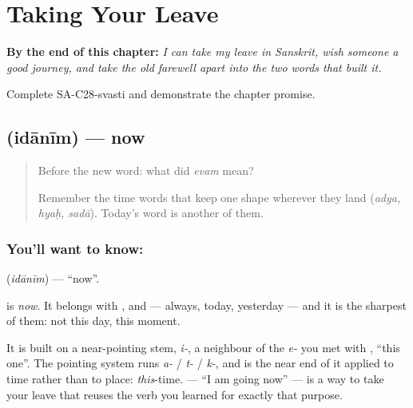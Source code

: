 
\chapter{Taking Your Leave}
\label{ch:sa-leave-more}

\begin{chapteropening}
\textbf{By the end of this chapter:} \emph{I can take my leave in Sanskrit, wish someone a good journey, and take the old farewell apart into the two words that built it.}

Complete SA-C28-svasti and demonstrate the chapter promise.
\end{chapteropening}

\section[\texorpdfstring{\sk{इदानीम्} (idānīm)}{इदानीम् (idānīm)}]{ (idānīm) — now}

\label{lesson:SA-C28-now}



\begin{quote}
Before the new word: what did \emph{evam} mean?

Remember the time words that keep one shape wherever they land (\emph{adya, hyaḥ, sadā}). Today's word is another of them.
\end{quote}

\subsection*{You'll want to know: }
\textbf{} (\emph{idānīm}) — \textquotedblleft{}now\textquotedblright{}.

\textbf{} is \emph{now}. It belongs with ,  and  — always, today, yesterday — and it is the sharpest of them: not this day, this moment.

It is built on a near-pointing stem, \emph{i-}, a neighbour of the \emph{e-} you met with , \textquotedblleft{}this one\textquotedblright{}. The pointing system runs \emph{a-} / \emph{t-} / \emph{k-}, and  is the near end of it applied to time rather than to place: \emph{this}-time.   — \textquotedblleft{}I am going now\textquotedblright{} — is a way to take your leave that reuses the verb you learned for exactly that purpose.

